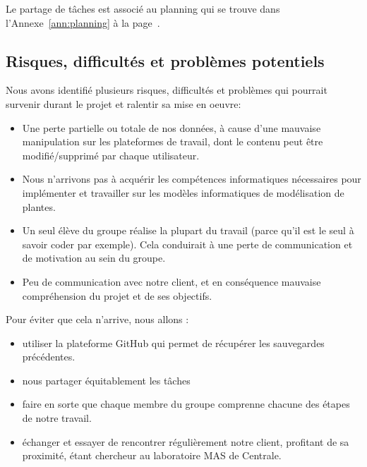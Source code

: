 Le partage de tâches est associé au planning qui se trouve
dans l'Annexe~\ref{ann:planning} à la page~\pageref{ann:planning}.

\subsection{Risques, difficultés et problèmes potentiels}
Nous avons identifié plusieurs risques, difficultés et problèmes qui pourrait survenir durant le projet et ralentir sa mise en oeuvre: 

\begin{itemize}
	\item Une perte partielle ou totale de nos données, à cause d'une mauvaise manipulation sur les plateformes de travail, dont le contenu peut être modifié/supprimé par chaque utilisateur.
	\item Nous n'arrivons pas à acquérir les compétences informatiques nécessaires pour implémenter et travailler sur les modèles informatiques de modélisation de plantes.
	\item Un seul élève du groupe réalise la plupart du travail (parce qu'il est le seul à savoir coder par exemple). Cela conduirait à une perte de communication et de motivation au sein du groupe.
	\item Peu de communication avec notre client, et en conséquence mauvaise compréhension du projet et de ses objectifs. 
\end{itemize}

Pour éviter que cela n'arrive, nous allons :
\begin{itemize}
	\item utiliser la plateforme GitHub qui permet de récupérer les sauvegardes précédentes.
	\item nous partager équitablement les tâches
	\item faire en sorte que chaque membre du groupe comprenne chacune des étapes de notre travail.
	\item échanger et essayer de rencontrer régulièrement notre client, profitant de sa proximité, étant chercheur au laboratoire MAS de Centrale.
\end{itemize}